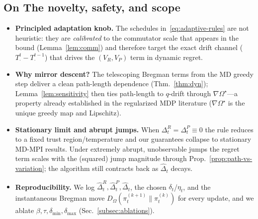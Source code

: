 \documentclass{article}
\theoremstyle{plain}
\theoremstyle{definition}
\theoremstyle{remark}
\newcommand{\1}{\mathbbm{1}}
\newcommand{\KL}{\mathrm{KL}}
\begin{document}
\subsection{On The novelty, safety, and scope}
\begin{itemize}[leftmargin=*,itemsep=2pt]
\item \textbf{Principled adaptation knob.} The schedules in~\eqref{eq:adaptive-rules} are not heuristic:
they are \emph{calibrated} to the commutator scale that appears in the bound (Lemma~\ref{lem:comm}) and
therefore target the exact drift channel ($T^t_\cdot-T^{t-1}_\cdot$) that drives the $(V_R,V_P)$ term in
dynamic regret.
\item \textbf{Why mirror descent?} The telescoping Bregman terms from the MD greedy step deliver a clean
path-length dependence (Thm.~\ref{thm:dyn}); Lemma~\ref{lem:sensitivity} then ties path-length to $q$-drift
through $\nabla\Omega^\star$---a property already established in the regularized MDP literature
(\(\nabla\Omega^\star\) is the unique greedy map and Lipschitz). 
\item \textbf{Stationary limit and abrupt jumps.} When $\Delta^R_t=\Delta^P_t\equiv0$ the rule reduces to a
fixed trust region/temperature and our guarantees collapse to stationary MD-MPI results. Under extremely
abrupt, unobservable jumps the regret term scales with the (squared) jump magnitude through
Prop.~\ref{prop:path-vs-variation}; the algorithm still contracts back as $\widehat{\Delta}_t$ decays.
\item \textbf{Reproducibility.} We log $\widehat{\Delta}^R_t,\widehat{\Delta}^P_t,\widehat{\Delta}_t$,
the chosen $\delta_t$/$\eta_t$, and the instantaneous Bregman move $D_\Omega(\pi^{(k+1)}_t\|\pi^{(k)}_t)$
for every update, and we ablate $\beta,\tau,\delta_{\min},\delta_{\max}$ (Sec.~\ref{subsec:ablations}).
\end{itemize}

\end{document}
